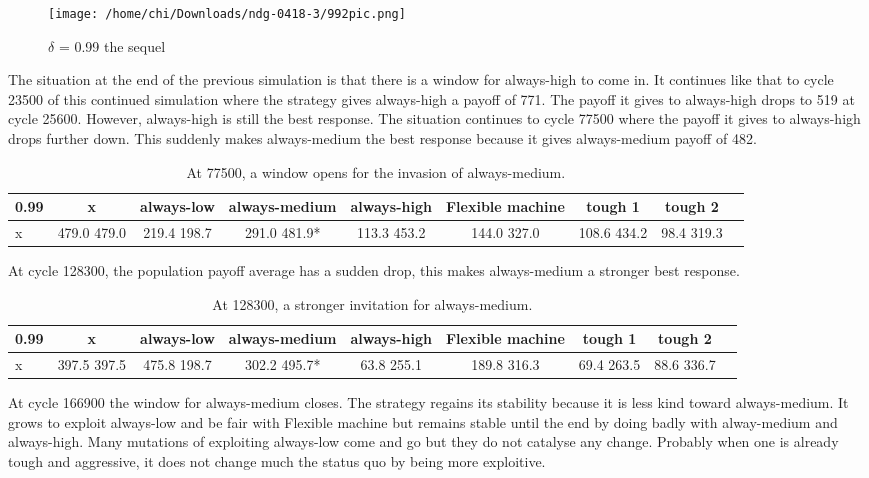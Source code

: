 \documentclass[12.5pt]{report}
\begin{document}
\begin{figure}[h!]
\center
\texttt{[image: /home/chi/Downloads/ndg-0418-3/992pic.png]}
\caption{$\delta$ = 0.99 the sequel}
\end{figure}

The situation at the end of the previous simulation is that there is a window for always-high to come in. It continues like that to cycle 23500 of this continued simulation where the strategy gives always-high a payoff of 771. The payoff it gives to always-high drops to 519 at cycle 25600. However, always-high is still the best response. The situation continues to cycle 77500 where the payoff it gives to always-high drops further down. This suddenly makes always-medium the best response because it gives always-medium payoff of 482.


\begin{table}[h!]
\center
\begin{tabular}{l|cccccccc}
\textbf{0.99}& x & always-low & always-medium & always-high & Flexible machine &tough 1 & tough 2\\
\hline
x& 479.0 479.0 &   219.4 198.7   & 291.0 481.9*  & 113.3 453.2&    144.0 327.0  &  108.6 434.2 &   98.4 319.3 \\
\end{tabular}
\caption{At 77500, a window opens for the invasion of always-medium.}
\end{table}

At cycle 128300, the population payoff average has a sudden drop, this makes always-medium a stronger best response.
\begin{table}[h!]
\center
\begin{tabular}{l|cccccccc}
\textbf{0.99}& x & always-low & always-medium & always-high & Flexible machine &tough 1 & tough 2\\
\hline
x &397.5 397.5   & 475.8 198.7  &  302.2 495.7* &  63.8 255.1  &   189.8 316.3 &   69.4 263.5 &    88.6 336.7\\
\end{tabular}
\caption{At 128300, a stronger invitation for always-medium.}
\end{table}

At cycle 166900 the window for always-medium closes. The strategy regains its stability because it is less kind toward always-medium. It grows to exploit always-low and be fair with Flexible machine but remains stable until the end by doing badly with alway-medium and always-high. Many mutations of exploiting always-low come and go but they do not catalyse any change. Probably when one is already tough and aggressive, it does not change much the status quo by being more exploitive.
\end{document}
